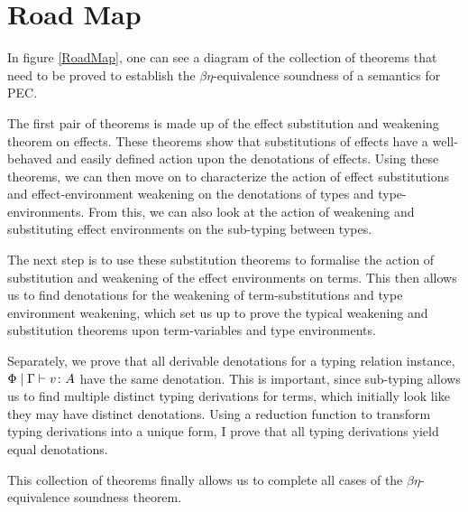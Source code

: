 \documentclass{Report}
\begin{document}
\section{Road Map}
In figure \ref{RoadMap}, one can see a diagram of the collection of theorems that need to be proved to establish the $\beta\eta$-equivalence soundness of a semantics for PEC.


The first pair of theorems is made up of the effect substitution and weakening theorem on effects. These theorems show that substitutions of effects have a well-behaved and easily defined action upon the denotations of effects. Using these theorems, we can then move on to characterize the action of effect substitutions and effect-environment weakening on the denotations of types and type-environments. From this, we can also look at the action of weakening and substituting effect environments on the sub-typing between types.

The next step is to use these substitution theorems to formalise the action of substitution and weakening of the effect environments on terms. This then allows us to find denotations for the weakening of term-substitutions and type environment weakening, which set us up to prove the typical weakening and substitution theorems upon term-variables and type environments. 

Separately, we prove that all derivable denotations for a typing relation instance, $\Phi\mid\Gamma \vdash v \colon A$ have the same denotation. This is important, since sub-typing allows us to find multiple distinct typing derivations for terms, which initially look like they may have distinct denotations. Using a reduction function to transform typing derivations into a unique form, I prove that all typing derivations yield equal denotations.

This collection of theorems finally allows us to complete all cases of the $\beta\eta$-equivalence soundness theorem.
\end{document}
